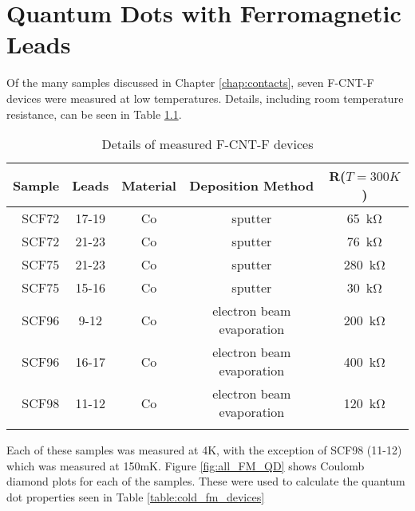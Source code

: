\chapter{Quantum Dots with Ferromagnetic Leads}
\label{sec:FMCNTQD}

Of the many samples discussed in Chapter \ref{chap:contacts}, seven F-CNT-F devices were measured at low temperatures. Details, including room temperature resistance, can be seen in Table \ref{table:rt_fm_devices}.

\begin{table}
    \centering
    \footnotesize
    \begin{tabular}{ r | c | c c c}
        Sample & Leads & Material & Deposition Method & R($T=300K$) \\ \hline
        SCF72 & 17-19 & Co & sputter & \SI{65}{\kilo\ohm} \\
        SCF72 & 21-23 & Co & sputter & \SI{76}{\kilo\ohm}\\
        SCF75 & 21-23 & Co & sputter & \SI{280}{\kilo\ohm}\\
        SCF75 & 15-16 & Co & sputter & \SI{30}{\kilo\ohm}\\
        SCF96 & 9-12  & Co & electron beam evaporation & \SI{200}{\kilo\ohm}\\
        SCF96 & 16-17 & Co & electron beam evaporation & \SI{400}{\kilo\ohm}\\
        SCF98 & 11-12 & Co & electron beam evaporation & \SI{120}{\kilo\ohm}\\
        \label{table:rt_fm_devices}  
    \end{tabular}
    \caption{Details of measured F-CNT-F devices}
\end{table}

Each of these samples was measured at 4K, with the exception of SCF98 (11-12) which was measured at 150mK. Figure \ref{fig:all_FM_QD} shows Coulomb diamond plots for each of the samples. These were used to calculate the quantum dot properties seen in Table \ref{table:cold_fm_devices}

